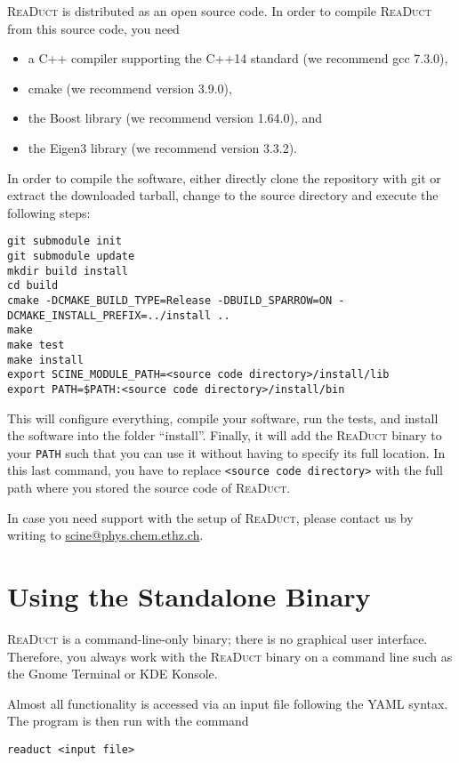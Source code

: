 \documentclass[]{tufte-book}
\begin{document}
\textsc{ReaDuct} is distributed as an open source code. In order to compile \textsc{ReaDuct} from this source code, you need
\begin{itemize}
 \item a C++ compiler supporting the C++14 standard (we recommend gcc 7.3.0),
 \item cmake (we recommend version 3.9.0),
 \item the Boost library (we recommend version 1.64.0), and
 \item the Eigen3 library (we recommend version 3.3.2).
\end{itemize}
In order to compile the software, either directly clone the repository with git or extract the downloaded tarball, change 
to the source directory and execute the following steps:
\begin{verbatim}
git submodule init
git submodule update
mkdir build install
cd build
cmake -DCMAKE_BUILD_TYPE=Release -DBUILD_SPARROW=ON -DCMAKE_INSTALL_PREFIX=../install ..
make
make test
make install
export SCINE_MODULE_PATH=<source code directory>/install/lib
export PATH=$PATH:<source code directory>/install/bin
\end{verbatim}
This will configure everything, compile your software, run the tests, and install the software 
into the folder ``install''. Finally, it will add the \textsc{ReaDuct} binary to your \texttt{PATH} such that you can use
it without having to specify its full location. In this last command, you have to replace \texttt{<source code directory>}
with the full path where you stored the source code of \textsc{ReaDuct}.

In case you need support with the setup of \textsc{ReaDuct}, please contact us by writing to \href{scine@phys.chem.ethz.ch}{scine@phys.chem.ethz.ch}.



\chapter{Using the Standalone Binary}

\textsc{ReaDuct} is a command-line-only binary; there is no graphical user interface. Therefore, you always work with the
\textsc{ReaDuct} binary on a command line such as the Gnome Terminal or KDE Konsole.

Almost all functionality is accessed via an input file following the YAML syntax. The program is then run with the
command

\begin{verbatim}
readuct <input file>
\end{verbatim}
\end{document}
